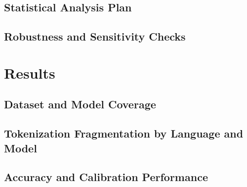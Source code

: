 \documentclass[runningheads]{llncs}
\begin{document}
\subsection{Statistical Analysis Plan}

\subsection{Robustness and Sensitivity Checks}

\section{Results}
\subsection{Dataset and Model Coverage}

\subsection{Tokenization Fragmentation by Language and Model}

\subsection{Accuracy and Calibration Performance}
\end{document}
